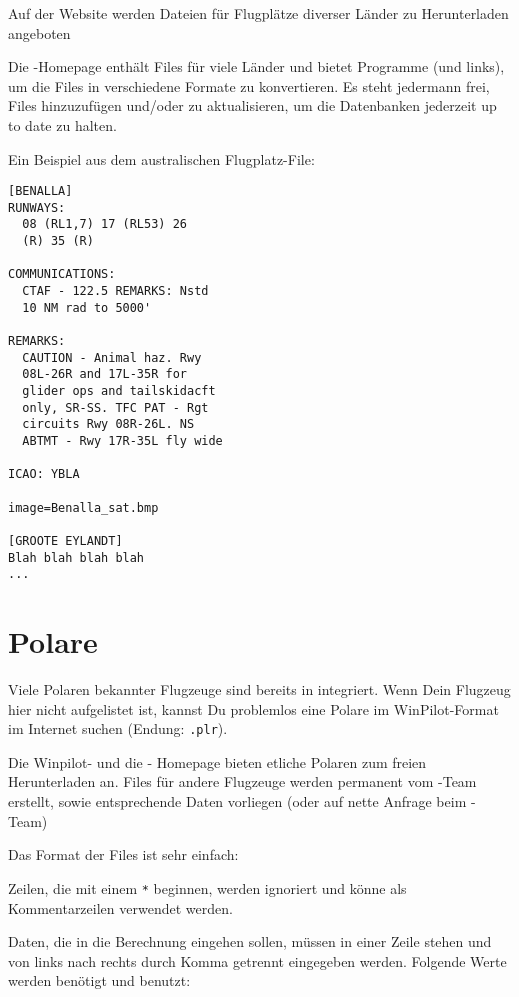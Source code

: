 Auf der \xc Website werden Dateien für Flugplätze diverser Länder zu Herunterladen angeboten


Die \xc-Homepage enthält Files für viele Länder und bietet Programme (und links), um die
Files in verschiedene Formate zu konvertieren.  Es steht jedermann frei, Files hinzuzufügen und/oder zu aktualisieren,
um die Datenbanken jederzeit up to date zu halten.

Ein Beispiel aus dem australischen Flugplatz-File:
\begin{verbatim}
[BENALLA]
RUNWAYS:
  08 (RL1,7) 17 (RL53) 26
  (R) 35 (R)

COMMUNICATIONS:
  CTAF - 122.5 REMARKS: Nstd
  10 NM rad to 5000'

REMARKS:
  CAUTION - Animal haz. Rwy
  08L-26R and 17L-35R for
  glider ops and tailskidacft
  only, SR-SS. TFC PAT - Rgt
  circuits Rwy 08R-26L. NS
  ABTMT - Rwy 17R-35L fly wide

ICAO: YBLA

image=Benalla_sat.bmp

[GROOTE EYLANDT]
Blah blah blah blah
...
\end{verbatim}


\section{Polare}\label{sec:glide-polar}

Viele Polaren bekannter Flugzeuge sind bereits in \xc integriert.  Wenn Dein Flugzeug  hier nicht
aufgelistet ist, kannst Du problemlos eine Polare im {\sc WinPilot}-Format im Internet suchen (Endung:
\verb|.plr|).

Die Winpilot- und die \xc - Homepage bieten etliche Polaren zum freien Herunterladen an. Files für
andere Flugzeuge werden permanent vom \xc-Team erstellt, sowie entsprechende Daten vorliegen (oder
auf nette Anfrage beim \xc-Team)

Das Format der Files ist sehr einfach:

Zeilen, die mit einem \verb|*| beginnen, werden ignoriert und könne als Kommentarzeilen verwendet
werden.

Daten, die in die Berechnung eingehen sollen, müssen in einer Zeile stehen und von links nach rechts durch
Komma getrennt eingegeben werden. Folgende Werte werden benötigt und benutzt:

